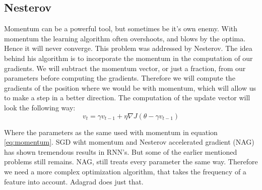 {\subsection{Nesterov}
Momentum can be a powerful tool, but sometimes be it's own enemy. With momentum the learning algorithm often overshoots, and blows by the  optima. Hence it will never converge. This problem was addressed by Nesterov. The idea behind his algorithm is to incorporate the momentum in the computation of our gradients. We will subtract the momentum vector, or just a fraction,  from our parameters before computing the gradients. Therefore we will compute the gradients of the position where we would be with momentum, which will allow us to make a step in a better direction. The computation of the update vector will look the following way:
\begin{equation}
v_t = \gamma v_{t-1} + \eta \nabla J (\theta -  \gamma v_{t-1})
\end{equation}

Where the parameters as the same used with momentum in equation \ref{eq:momentum}. SGD wiht momentum and Nesterov accelerated gradient (NAG) has shown tremendous results in RNN's. But some of the earlier mentioned problems still remains.  NAG, still treats every parameter the same way. Therefore we need a more complex optimization algorithm, that takes the frequency of a feature into account. Adagrad does just that. 

}
